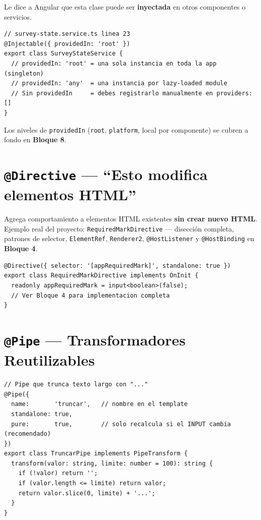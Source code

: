 \documentclass[12pt, a4paper]{article}
\begin{document}
Le dice a Angular que esta clase puede ser \textbf{inyectada} en otros componentes o servicios.

\begin{lstlisting}
// survey-state.service.ts linea 23
@Injectable({ providedIn: 'root' })
export class SurveyStateService {
  // providedIn: 'root' = una sola instancia en toda la app (singleton)
  // providedIn: 'any'  = una instancia por lazy-loaded module
  // Sin providedIn     = debes registrarlo manualmente en providers: []
}
\end{lstlisting}

Los niveles de \texttt{providedIn} (\texttt{root}, \texttt{platform}, local por componente) se cubren a fondo en \textbf{Bloque 8}.

\section{  \texttt{@Directive} --- ``Esto modifica elementos HTML''}

Agrega comportamiento a elementos HTML existentes \textbf{sin crear nuevo HTML}.
Ejemplo real del proyecto: \texttt{RequiredMarkDirective} --- disección completa, patrones de selector,
\texttt{ElementRef}, \texttt{Renderer2}, \texttt{@HostListener} y \texttt{@HostBinding} en \textbf{Bloque 4}.

\begin{lstlisting}
@Directive({ selector: '[appRequiredMark]', standalone: true })
export class RequiredMarkDirective implements OnInit {
  readonly appRequiredMark = input<boolean>(false);
  // Ver Bloque 4 para implementacion completa
}
\end{lstlisting}


\section{  \texttt{@Pipe} --- Transformadores Reutilizables}

\begin{lstlisting}
// Pipe que trunca texto largo con "..."
@Pipe({
  name:       'truncar',   // nombre en el template
  standalone: true,
  pure:       true,        // solo recalcula si el INPUT cambia (recomendado)
})
export class TruncarPipe implements PipeTransform {
  transform(valor: string, limite: number = 100): string {
    if (!valor) return '';
    if (valor.length <= limite) return valor;
    return valor.slice(0, limite) + '...';
  }
}
\end{lstlisting}
\end{document}
